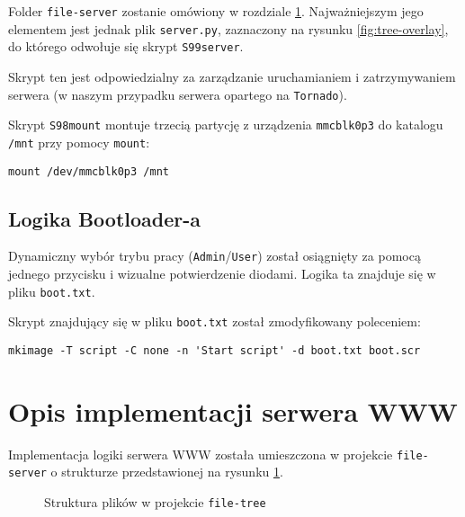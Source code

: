 \documentclass{article}
\begin{document}
Folder \texttt{file-server} zostanie omówiony w rozdziale \ref{implementacja-www}. Najważniejszym jego elementem jest jednak plik \texttt{server.py}, zaznaczony na rysunku \ref{fig:tree-overlay}, do którego odwołuje się skrypt \texttt{S99server}. 

Skrypt ten jest odpowiedzialny za zarządzanie uruchamianiem i zatrzymywaniem serwera (w naszym przypadku serwera opartego na \texttt{Tornado}).

Skrypt \texttt{S98mount} montuje trzecią partycję z urządzenia \texttt{mmcblk0p3} do katalogu \texttt{/mnt} przy pomocy \texttt{mount}:

\begin{verbatim}
mount /dev/mmcblk0p3 /mnt
\end{verbatim}

\subsection{Logika Bootloader-a}

Dynamiczny wybór trybu pracy (\texttt{Admin}/\texttt{User}) został osiągnięty za pomocą jednego przycisku i wizualne potwierdzenie diodami. Logika ta znajduje się w pliku \texttt{boot.txt}.

Skrypt znajdujący się w pliku \texttt{boot.txt} został zmodyfikowany poleceniem:

\begin{verbatim}
mkimage -T script -C none -n 'Start script' -d boot.txt boot.scr
\end{verbatim}

\section{Opis implementacji serwera WWW}
\label{implementacja-www}

Implementacja logiki serwera WWW została umieszczona w projekcie \texttt{file-server} o strukturze przedstawionej na rysunku \ref{fig:tree}.


\begin{figure}[H]
    \caption{Struktura plików w projekcie \texttt{file-tree}}
    \label{fig:tree}
\end{figure}
\end{document}
